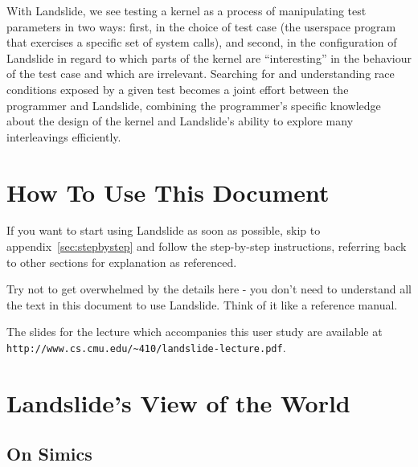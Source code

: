 \documentclass{article}
\begin{document}
With Landslide, we see testing a kernel as a process of manipulating test parameters in two ways: first, in the choice of test case (the userspace program that exercises a specific set of system calls), and second, in the configuration of Landslide in regard to which parts of the kernel are ``interesting'' in the behaviour of the test case and which are irrelevant.
Searching for and understanding race conditions exposed by a given test becomes a joint effort between the programmer and Landslide, combining the programmer's specific knowledge about the design of the kernel and Landslide's ability to explore many interleavings efficiently.

\section{How To Use This Document}

If you want to start using Landslide as soon as possible, skip to appendix~\ref{sec:stepbystep} and follow the step-by-step instructions, referring back to other sections for explanation as referenced.

Try not to get overwhelmed by the details here - you don't need to understand all the text in this document to use Landslide. Think of it like a reference manual.

The slides for the lecture which accompanies this user study are available at \\ \texttt{http://www.cs.cmu.edu/{\textasciitilde}410/landslide-lecture.pdf}.

\section{Landslide's View of the World}
\label{sec:anatomy}

\subsection{On Simics}
\end{document}
